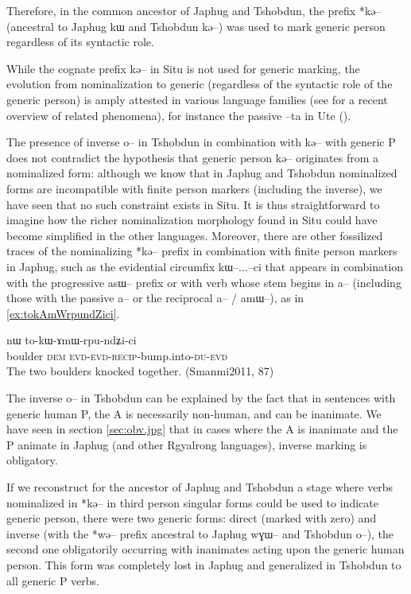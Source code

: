 \documentclass[oldfontcommands,oneside,a4paper,11pt]{article}
\newcommand{\ipa}[1]{{\phon \mbox{#1}}} %
\begin{document}
Therefore, in the common ancestor of Japhug and Tshobdun, the prefix *\ipa{kə--} (ancestral to Japhug \ipa{kɯ} and Tshobdun \ipa{kə--}) was used to mark generic person regardless of its syntactic role. 

While the cognate prefix \ipa{kə--} in Situ is not used for generic marking, the evolution from nominalization to generic (regardless of the syntactic role of the generic person) is amply attested in various language families (see \citealt{sanso14nmlz} for a recent overview of related phenomena), for instance the passive \ipa{--ta} in Ute (\citealt[264-7]{givon11ute}). %


The presence of inverse \ipa{o--} in Tshobdun in combination with \ipa{kə--} with generic P does not contradict the hypothesis that generic person \ipa{kə--} originates from a nominalized form: although we know that in Japhug and Tshobdun nominalized forms are incompatible with finite person markers (including the inverse), we have seen that no such constraint exists in Situ. It is thus straightforward to imagine how the richer nominalization morphology found in Situ could have become simplified in the other languages. Moreover, there are other fossilized traces of the nominalizing *\ipa{kə--} prefix in combination with finite person markers in Japhug, such as the evidential circumfix \ipa{kɯ--}...\ipa{--ci} that appears in combination with the progressive \ipa{asɯ--} prefix or with verb whose stem begins in \ipa{a--} (including those with the passive \ipa{a--} or the reciprocal \ipa{a--} / \ipa{amɯ--}), as in \ref{ex:tokAmWrpundZici}. 


\begin{exe}
\ex \label{ex:tokAmWrpundZici}
\gll \ipa{rŋgɯ}  	\ipa{nɯ}  	\ipa{to-kɯ-ɤmɯ-rpu-ndʑi-ci}  \\
boulder \textsc{dem} \textsc{evd}-\textsc{evd}-\textsc{recip}-bump.into-\textsc{du}-\textsc{evd} \\
\glt The two boulders knocked together. (Smanmi2011, 87)
\end{exe}


The inverse  \ipa{o--} in Tshobdun can be explained by  the fact that in sentences with generic human P, the A is necessarily non-human, and can be inanimate. We have seen in section \ref{sec:obv.jpg} that in cases where the A is inanimate and the P animate in Japhug (and other Rgyalrong languages), inverse marking is obligatory. 


If we reconstruct for the ancestor of Japhug and Tshobdun a stage where verbs nominalized in *\ipa{kə--} in third person singular forms could be used to indicate generic person, there were two generic forms: direct (marked with zero) and inverse (with the *\ipa{wə--} prefix ancestral to Japhug \ipa{wɣɯ--} and Tshobdun \ipa{o--}), the second one obligatorily occurring with inanimates acting upon the generic human person. This form was completely lost in Japhug and generalized in Tshobdun to all generic P verbs.
\end{document}
